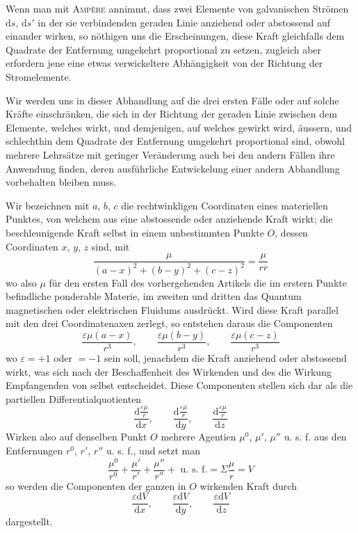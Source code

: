 Wenn man mit \textsc{Ampère} annimmt, dass zwei Elemente von galvanischen Strömen $\mathrm{d}s$, $\mathrm{d}s'$ in der sie verbindenden geraden Linie anziehend oder abstossend auf einander wirken, so nöthigen uns die Erscheinungen, diese Kraft gleichfalls dem Quadrate der Entfernung umgekehrt proportional zu setzen, zugleich aber erfordern jene eine etwas verwickeltere Abhängigkeit von der Richtung der Stromelemente.

Wir werden uns in dieser Abhandlung auf die drei ersten Fälle oder auf solche Kräfte einschränken, die sich in der Richtung der geraden Linie zwischen dem Elemente, welches wirkt, und demjenigen, auf welches gewirkt wird, äussern, und schlechthin dem Quadrate der Entfernung umgekehrt proportional sind, obwohl mehrere Lehrsätze mit geringer Veränderung auch bei den andern Fällen ihre Anwendung finden, deren ausführliche Entwickelung einer andern Abhandlung vorbehalten bleiben muss.

Wir bezeichnen mit $a$, $b$, $c$ die rechtwinkligen Coordinaten eines materiellen Punktes, von welchem aus eine abstossende oder anziehende Kraft wirkt; die beschleunigende Kraft selbst in einem unbestimmten Punkte $O$, dessen Coordinaten $x$, $y$, $z$ sind, mit
\[
\frac{\mu}{(a-x)^2+(b-y)^2+(c-z)^2}=\frac{\mu}{rr}
\]
wo also $\mu$ für den ersten Fall des vorhergehenden Artikels die im erstern Punkte
befindliche ponderable Materie, im zweiten und dritten das Quantum magnetischen oder elektrischen Fluidums ausdrückt. Wird diese Kraft parallel mit den drei Coordinatenaxen zerlegt, so entstehen daraus die Componenten
\[
\frac{\varepsilon\mu(a-x)}{r^3},\qquad \frac{\varepsilon\mu(b-y)}{r^3},\qquad \frac{\varepsilon\mu(c-z)}{r^3}
\]
wo $\varepsilon=+1$ oder $=-1$ sein soll, jenachdem die Kraft anziehend oder abstossend wirkt, was sich nach der Beschaffenheit des Wirkenden und des die Wirkung Empfangenden von selbst entscheidet. Diese Componenten stellen sich dar als die partiellen Differentialquotienten
\[
\frac{\mathrm{d}\frac{\varepsilon\mu}{r}}{\mathrm{d}x},\qquad \frac{\mathrm{d}\frac{\varepsilon\mu}{r}}{\mathrm{d}y},\qquad \frac{\mathrm{d}\frac{\varepsilon\mu}{r}}{\mathrm{d}z}
\]
Wirken also auf denselben Punkt $O$ mehrere Agentien $\mu^0$, $\mu'$, $\mu''$ u. s. f. aus den Entfernungen $r^0$, $r'$, $r''$ u. s. f., und setzt man
\[
\frac{\mu^0}{r^0}+\frac{\mu'}{r'}+\frac{\mu''}{r''}+\text{ u. s. f.}=\Sigma\frac{\mu}{r}=V
\]
so werden die Componenten der ganzen in $O$ wirkenden Kraft durch
\[
\frac{\varepsilon\mathrm{d}V}{\mathrm{d}x},\qquad \frac{\varepsilon\mathrm{d}V}{\mathrm{d}y},\qquad \frac{\varepsilon\mathrm{d}V}{\mathrm{d}z}
\]
dargestellt.


